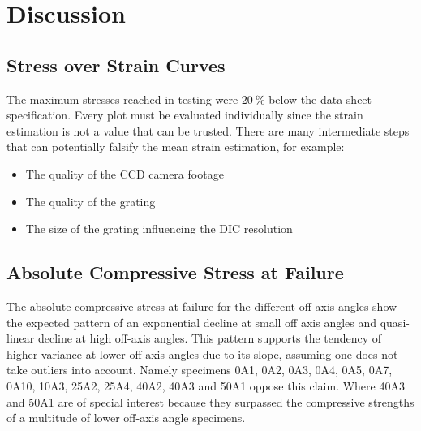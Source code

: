 \section{Discussion}
\label{sec:discussion}

\subsection*{Stress over Strain Curves}

The maximum stresses reached in testing were $\SI{20}{\percent}$ below the data sheet specification. Every plot must be evaluated individually since the strain estimation is not a value that can be trusted. There are many intermediate steps that can potentially falsify the mean strain estimation, for example:\\
\begin{itemize}
    \item The quality of the CCD camera footage
    \item The quality of the grating
    \item The size of the grating influencing the DIC resolution
\end{itemize}

\subsection*{Absolute Compressive Stress at Failure}

The absolute compressive stress at failure for the different off-axis angles show the expected pattern of an exponential decline at small off axis angles and quasi-linear decline at high off-axis angles. This pattern supports the tendency of higher variance at lower off-axis angles due to its slope, assuming one does not take outliers into account. Namely specimens 0A1, 0A2, 0A3, 0A4, 0A5, 0A7, 0A10, 10A3, 25A2, 25A4, 40A2, 40A3 and 50A1 oppose this claim. Where 40A3 and 50A1 are of special interest because they surpassed the compressive strengths of a multitude of lower off-axis angle specimens.


